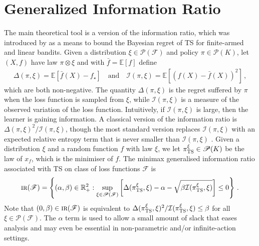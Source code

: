\documentclass[letter, 12pt]{report}
\newcommand{\R}{\mathbb R}
\newcommand{\E}{\mathbb E}
\newcommand{\sF}{\mathscr F}
\newcommand{\sP}{\mathscr P}
\newcommand{\I}{\mathcal{I}}
\newcommand{\1}{\mathbf{1}}
\newcommand{\IR}{\operatorname{\textsc{ir}}}
\newcommand{\ts}{\textsc{TS}\xspace}
\theoremstyle{plain}
\theoremstyle{definition}
\theoremstyle{remark}
\begin{document}
\chapter{Generalized Information Ratio}\label{ch:gir}
The main theoretical tool is a version of the information ratio, which was introduced by \cite{RV16} as a means to bound the Bayesian regret of
\ts for finite-armed and linear bandits.
Given a distribution $\xi \in \sP(\sF)$ and policy $\pi \in \sP(K)$, let $(X, f)$ have law $\pi \otimes \xi$ and with $\bar f = \E[f]$ define
\begin{align*}
    \Delta(\pi, \xi) = \E\left[\bar f(X) - f_\star\right] \quad \text{and} \quad
    \I(\pi, \xi) = \E\left[(f(X) - \bar f(X))^2\right]\,,
\end{align*}
which are both non-negative.
The quantity $\Delta(\pi, \xi)$ is the regret suffered by $\pi$ when the loss function is sampled from $\xi$, while $\I(\pi, \xi)$ is a measure of the observed variation
of the loss function. Intuitively, if $\I(\pi, \xi)$ is large, then the learner is gaining information.
A classical version of the information ratio is $\Delta(\pi, \xi)^2 / \I(\pi, \xi)$, though the most standard version replaces $\I(\pi, \xi)$ with
an expected relative entropy term that is never smaller than $\I(\pi, \xi)$ \citep{RV16}.
Given a distribution $\xi$ and a random function $f$ with law $\xi$, we let $\pi^\xi_\ts \in \sP(K)$ be the law of $x_f$, which is the minimiser of $f$.
The minimax generalised information ratio associated with \ts on class of loss functions $\sF$ is
\begin{align*}
    \IR(\sF) = \left\{(\alpha, \beta) \in \R_+^2 : \sup_{\xi \in \sP(\sF)} \left[\Delta(\pi^\xi_\ts, \xi) - \alpha - \sqrt{\beta \I(\pi^\xi_\ts, \xi)}\right] \leq 0 \right\} \,.
\end{align*}
Note that $(0, \beta) \in \IR(\sF)$ is equivalent to $\Delta(\pi_\ts^\xi, \xi)^2 / \I(\pi_\ts^\xi, \xi) \leq \beta$ for all $\xi \in \sP(\sF)$.
The $\alpha$ term is used to allow a small amount of slack that eases analysis and may even be essential in non-parametric and/or infinite-action settings.
\end{document}
